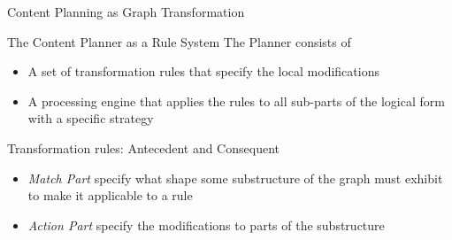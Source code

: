 \documentclass{beamer}
\begin{document}

\begin{frame}{Content Planning as Graph Transformation}
  \begin{block}{The Content Planner as a Rule System}
    The Planner consists of
    \begin{itemize}
    \item A set of transformation rules that specify the local modifications
    \item A processing engine that applies the rules to all sub-parts of the
      logical form with a specific strategy
    \end{itemize}

  \end{block}
  \begin{block}{Transformation rules: Antecedent and Consequent}
    \begin{itemize}
    \item \textit{Match Part} specify what shape some substructure of the graph
      must exhibit to make it applicable to a rule
    \item \textit{Action Part} specify the modifications to parts of the
      substructure
    \end{itemize}
  \end{block}
\end{frame}

\end{document}
